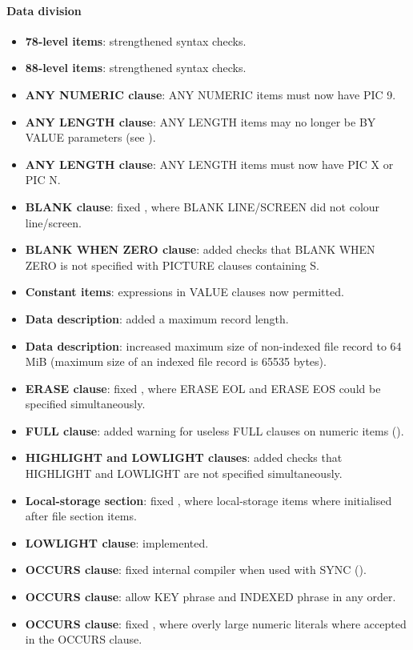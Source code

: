 \paragraph{Data division}
\begin{itemize}
\item \textbf{78-level items}: strengthened syntax checks.
\item \textbf{88-level items}: strengthened syntax checks.
\item \textbf{ANY NUMERIC clause}: ANY NUMERIC items must now have PIC 9.
\item \textbf{ANY LENGTH clause}: ANY LENGTH items may no longer be BY VALUE parameters (see ).
\item \textbf{ANY LENGTH clause}: ANY LENGTH items must now have PIC X or PIC N.
\item \textbf{BLANK clause}: fixed , where BLANK LINE\slash{}SCREEN did not colour line\slash{}screen.
\item \textbf{BLANK WHEN ZERO clause}: added checks that BLANK WHEN ZERO is not specified with PICTURE clauses containing S.
\item \textbf{Constant items}: expressions in VALUE clauses now permitted.
\item \textbf{Data description}: added a maximum record length.
\item \textbf{Data description}: increased maximum size of non-indexed file record to 64 MiB (maximum size of an indexed file record is 65535 bytes).
\item \textbf{ERASE clause}: fixed , where ERASE EOL and ERASE EOS could be specified simultaneously.
\item \textbf{FULL clause}: added warning for useless FULL clauses on numeric items ().
\item \textbf{HIGHLIGHT and LOWLIGHT clauses}: added checks that HIGHLIGHT and LOWLIGHT are not specified simultaneously.
\item \textbf{Local-storage section}: fixed , where local-storage items where initialised after file section items.
\item \textbf{LOWLIGHT clause}: implemented.
\item \textbf{OCCURS clause}: fixed internal compiler when used with SYNC ().
\item \textbf{OCCURS clause}: allow KEY phrase and INDEXED phrase in any order.
\item \textbf{OCCURS clause}: fixed , where overly large numeric literals where accepted in the OCCURS clause.

\end{itemize}

